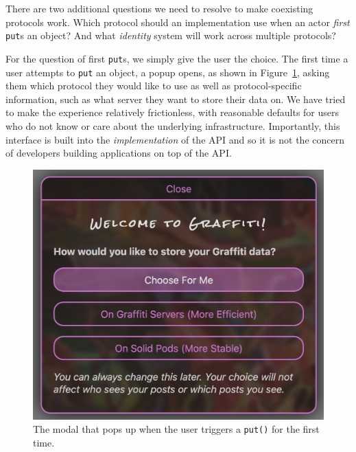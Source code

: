 There are two additional questions we need to resolve to
make coexisting protocols work.
Which protocol should an implementation use
when an actor \emph{first} \texttt{put}s an object?
And what \emph{identity} system will work across multiple
protocols?

For the question of first \texttt{put}s, we simply give the user the choice.
The first time a user attempts to \texttt{put} an object,
a popup opens,
as shown in Figure~\ref{above-and-below:figure:choose-protocol},
asking them which protocol they would like to use
as well as protocol-specific information, such as what server
they want to store their data on.
We have tried to make the experience relatively frictionless, with
reasonable defaults for
users who do not know or care about the underlying infrastructure.
Importantly, this interface is built into the \emph{implementation}
of the API and so it is not the concern of developers building
applications on top of the API.

\begin{figure}[h]
    \includegraphics[width=\columnwidth]{paper/figures/choose-protocol.png}
    \caption{The modal that pops up when the user triggers a \texttt{put()} for the first time.}
    \label{above-and-below:figure:choose-protocol}
\end{figure}

